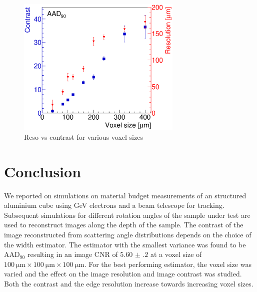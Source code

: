 \documentclass{PoS}
\newcommand{\aadninety}{\ensuremath{\textrm{AAD}_\textrm{90}}}
\begin{document}
\begin{figure}[t!]
  \centering
  \includegraphics[width=0.70\textwidth]{figures/CRvsVS.eps}
    \caption[contrast]{%
    Reso vs contrast for various voxel sizes}
  \label{fig:resovscontrast}
\end{figure}





\section{Conclusion}

We reported on simulations on material budget measurements of an structured aluminium cube using GeV electrons and a beam telescope for tracking. 
Subsequent simulations for different rotation angles of the sample under test are used to reconstruct images along the depth of the sample. 
The contrast of the image reconstructed from scattering angle distributions depends on the choice of the width estimator. 
The estimator with the smallest variance was found to be $\aadninety$ resulting in an image CNR of $\num{5.60(20)}$ at a voxel size of $\SI{100}{\um} \times \SI{100}{\um} \times \SI{100}{\um}$.
For the best performing estimator, the voxel size was varied and the effect on the image resolution and image contrast was studied.
Both the contrast and the edge resolution increase towards increasing voxel sizes. 






\end{document}
